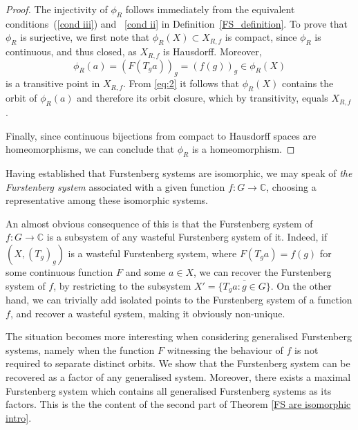 \documentclass{amsart}
\numberwithin{equation}{section}
\theoremstyle{definition}
\theoremstyle{plain}
\newcommand{\C}{{\mathbb C}}
\begin{document}
\begin{proof}
The injectivity of $\phi_R$ follows immediately from the equivalent conditions~(\ref{cond iii}) and ~\ref{cond ii} in Definition~\ref{FS_definition}. To prove that $\phi_R$ is surjective, we first note that $\phi_R(X)\subset X_{R,f}$ is 
compact, since $\phi_R$ is continuous, and thus closed, 
as $X_{R,f}$ is Hausdorff. Moreover,
$$\phi_R(a)=(F(T_g a))_g = (f(g))_g \in \phi_R(X)$$ 
is a transitive point in $X_{R,f}$. From \eqref{eq:2} it follows that $\phi_R(X)$ contains the orbit of $\phi_R(a)$ and therefore its orbit closure, which by transitivity, equals $X_{R,f}$.  

Finally, since continuous bijections from compact to Hausdorff spaces are homeomorphisms, we can conclude that $\phi_R$ is a homeomorphism.
\end{proof}

Having established that Furstenberg systems are isomorphic, we may speak of \textit{the Furstenberg system} associated with a given function $f \colon G \to \C$, choosing a representative among these isomorphic systems. 

An almost obvious consequence of this is that 
the Furstenberg system of $f:G\to \C$ is a subsystem of any wasteful Furstenberg system of it. Indeed, if $(X,(T_g)_g)$ is a wasteful Furstenberg system, where $F(T_g a)=f(g)$ for some continuous function $F$ and some $a \in X$, we can recover the Furstenberg system of $f$, by restricting to the subsystem $X'=\overline{\{T_ga: g\in G\}}$. On the other hand, we can trivially add isolated points to the Furstenberg system of a function $f$, and recover a wasteful system, making it obviously non-unique.


The situation becomes more interesting when considering 
generalised Furstenberg systems, namely when the 
function $F$ witnessing the behaviour of $f$ is not 
required to separate distinct
orbits. We show that the Furstenberg system can be 
recovered as a factor of any generalised system. 
Moreover, there exists a maximal Furstenberg system 
which contains all generalised Furstenberg systems as 
its factors. This is the the content of the second part of Theorem \ref{FS are isomorphic intro}.
\end{document}
